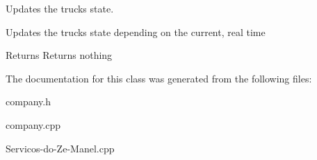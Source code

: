 Updates the truck\textquotesingle{}s state. 

Updates the truck\textquotesingle{}s state depending on the current, real time

\begin{DoxyReturn}{Returns}
Returns nothing 
\end{DoxyReturn}


The documentation for this class was generated from the following files\+:\begin{DoxyCompactItemize}
\item 
company.\+h\item 
company.\+cpp\item 
Servicos-\/do-\/\+Ze-\/\+Manel.\+cpp\end{DoxyCompactItemize}
